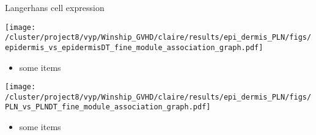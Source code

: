 \documentclass[final,hyperref={pdfpagelabels=false}]{beamer}
\begin{document}
\begin{frame}{}
\begin{columns}[t]
\begin{column}{.25\linewidth}
\begin{block}{Langerhans cell expression}
	  \begin{minipage}{0.45\textwidth}
            \texttt{[image: /cluster/project8/vyp/Winship\_GVHD/claire/results/epi\_dermis\_PLN/figs/epidermis\_vs\_epidermisDT\_fine\_module\_association\_graph.pdf]}
          \end{minipage}
{\small	  \begin{itemize}
	    \item some items
	   \end{itemize}}
	  \begin{minipage}{0.45\textwidth}
            \texttt{[image: /cluster/project8/vyp/Winship\_GVHD/claire/results/epi\_dermis\_PLN/figs/PLN\_vs\_PLNDT\_fine\_module\_association\_graph.pdf]}
          \end{minipage}


{\small
	  \begin{itemize}
            \item some items
           \end{itemize}}
        \end{block}
      \end{column}


    \end{columns}
  \end{frame}
\end{document}
